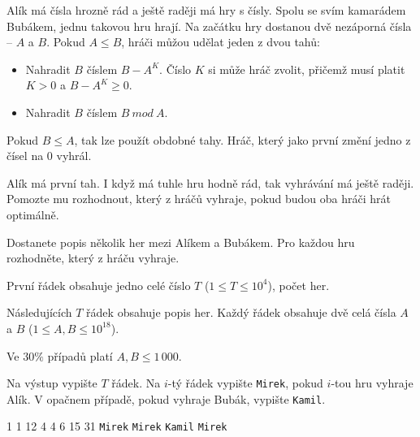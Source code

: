 





Alík má čísla hrozně rád a ještě raději má hry s čísly.
Spolu se svím kamarádem Bubákem, jednu takovou hru hrají.
Na začátku hry dostanou dvě nezáporná čísla -- $A$ a $B$.
Pokud $A \leqslant B$, hráči můžou udělat jeden z dvou tahů:

\begin{itemize}
    \item Nahradit $B$ číslem $B - A^K$. Číslo $K$ si může hráč zvolit, přičemž musí platit $K > 0$ a $B - A^K \ge 0$.
    \item Nahradit $B$ číslem $B\ mod\ A$.
\end{itemize}

Pokud $B \leqslant A$, tak lze použít obdobné tahy.
Hráč, který jako první změní jedno z čísel na $0$ vyhrál.

Alík má první tah. I když má tuhle hru hodně rád, tak vyhrávání má ještě raději.
Pomozte mu rozhodnout, který z hráčů vyhraje, pokud budou oba hráči hrát optimálně.


Dostanete popis několik her mezi Alíkem a Bubákem.
Pro každou hru rozhodněte, který z hráču vyhraje.


První řádek obsahuje jedno celé číslo $T$ ($1 \le T \le 10^4$), počet her.

Následujících $T$ řádek obsahuje popis her. Každý řádek obsahuje dvě celá čísla $A$ a $B$ ($1 \le A, B \le 10^{18}$).

\smallskip

Ve $30\%$ případů platí $A,B \le 1\,000$.


Na výstup vypište $T$ řádek.
Na $i$-tý řádek vypište \texttt{Mirek}, pokud $i$-tou hru vyhraje Alík. V opačnem případě, pokud vyhraje Bubák, vypište \texttt{Kamil}.


1 1
12 4
4 6
15 31
\sampleOUT
\texttt{Mirek}
\texttt{Mirek}
\texttt{Kamil}
\texttt{Mirek}
\sampleEND


